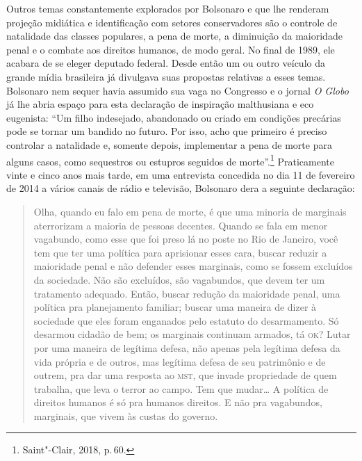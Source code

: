 Outros temas constantemente explorados por Bolsonaro e que lhe renderam
projeção midiática e identificação com setores conservadores são o
controle de natalidade das classes populares, a pena de morte, a
diminuição da maioridade penal e o combate aos direitos humanos, de modo
geral. No final de 1989, ele acabara de se eleger deputado federal.
Desde então um ou outro veículo da grande mídia brasileira já divulgava
suas propostas relativas a esses temas. Bolsonaro nem sequer havia
assumido sua vaga no Congresso e o jornal \emph{O Globo} já lhe abria
espaço para esta declaração de inspiração malthusiana e eco eugenista:
``Um filho indesejado, abandonado ou criado em condições precárias pode
se tornar um bandido no futuro. Por isso, acho que primeiro é preciso
controlar a natalidade e, somente depois, implementar a pena de morte
para alguns casos, como sequestros ou estupros seguidos de
morte''.\footnote{Saint"-Clair, 2018, p.\,60.} Praticamente vinte e cinco
anos mais tarde, em uma entrevista concedida no dia 11 de fevereiro de
2014 a vários canais de rádio e televisão, Bolsonaro dera a seguinte
declaração:

\begin{quote}
Olha, quando eu falo em pena de morte, é que uma minoria de marginais
aterrorizam a maioria de pessoas decentes. Quando se fala em menor
vagabundo, como esse que foi preso lá no poste no Rio de Janeiro, você
tem que ter uma política para aprisionar esses cara, buscar reduzir a
maioridade penal e não defender esses marginais, como se fossem
excluídos da sociedade. Não são excluídos, são vagabundos, que devem ter
um tratamento adequado. Então, buscar redução da maioridade penal, uma
política pra planejamento familiar; buscar uma maneira de dizer à
sociedade que eles foram enganados pelo estatuto do desarmamento. Só
desarmou cidadão de bem; os marginais continuam armados, tá \textsc{ok}? Lutar
por uma maneira de legítima defesa, não apenas pela legítima defesa da
vida própria e de outros, mas legítima defesa de seu patrimônio e de
outrem, pra dar uma resposta ao \textsc{mst}, que invade propriedade de quem
trabalha, que leva o terror ao campo. Tem que mudar\ldots{} A política de
direitos humanos é só pra humanos direitos. E não pra vagabundos,
marginais, que vivem às custas do governo.
\end{quote}

